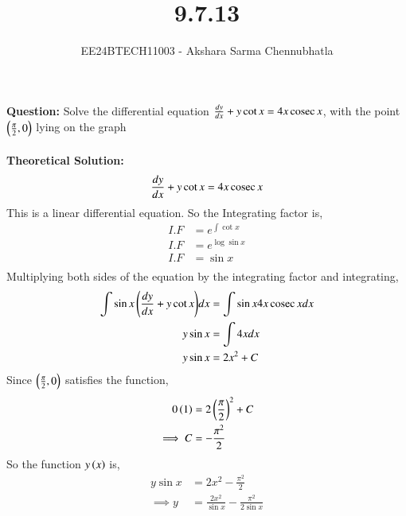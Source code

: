 \documentclass[journal]{IEEEtran}
\begin{document}

\vspace{3cm}

\title{9.7.13}
\author{EE24BTECH11003 - Akshara Sarma Chennubhatla}
{\let\newpage\relax\maketitle}
\textbf{Question:}
Solve the differential equation $\frac{dy}{dx} + y \cot x = 4x \,\text{cosec}\, x$, with the point $\left(\frac{\pi}{2}, 0\right)$ lying on the graph\\

\solution\\
\textbf{Theoretical Solution:}\\

\begin{align}
	\frac{dy}{dx} + y \cot x &= 4x \,\text{cosec}\, x\\
\end{align}
This is a linear differential equation. So the Integrating factor is,
\begin{align}
	I.F &= e ^ {\int{\cot x}}\\
	I.F &= e ^ {\log\sin x}\\
	I.F &= \sin x\\
\end{align}
Multiplying both sides of the equation by the integrating factor and integrating,
\begin{align}
	\int{\sin x\ensuremath{\left(\frac{dy}{dx} + y\cot x\right)}} dx &= \int{\sin x 4x \,\text{cosec}\,x} dx\\
	y \sin x &= \int{4x} dx\\
	y \sin x &= 2 x^2 + C\\
\end{align}
Since $\left(\frac{\pi}{2}, 0\right)$ satisfies the function,
\begin{align}
	0 \left(1\right) &= 2 \left(\frac{\pi}{2}\right)^2 + C\\
	\implies C &= -\frac{\pi^2}{2}\\
\end{align}
So the function $y\left(x\right)$ is,
\begin{align}
	y \sin x &= 2x^2 - \frac{\pi^2}{2}\\
	\implies y &= \frac{2x^2}{\sin x} - \frac{\pi^2}{2\sin x}\\
\end{align}
\end{document}
